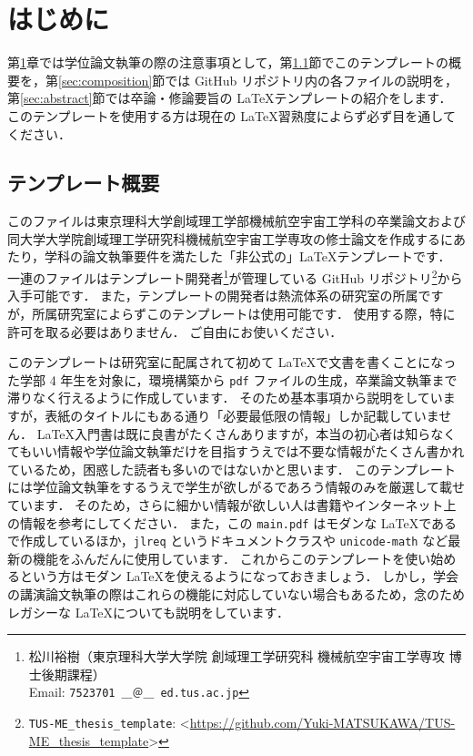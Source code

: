 \chapter{はじめに}
\label{ch:introduction}

第\ref{ch:introduction}章では学位論文執筆の際の注意事項として，第\ref{sec:template}節でこのテンプレートの概要を，第\ref{sec:composition}節では GitHub リポジトリ内の各ファイルの説明を，第\ref{sec:abstract}節では卒論・修論要旨の \LaTeX テンプレートの紹介をします．
このテンプレートを使用する方は現在の \LaTeX 習熟度によらず必ず目を通してください．

\section{テンプレート概要}
\label{sec:template}

このファイルは東京理科大学創域理工学部機械航空宇宙工学科の卒業論文および同大学大学院創域理工学研究科機械航空宇宙工学専攻の修士論文を作成するにあたり，学科の論文執筆要件を満たした「非公式の」\LaTeX テンプレートです．
一連のファイルはテンプレート開発者\footnote{松川裕樹（東京理科大学大学院 創域理工学研究科 機械航空宇宙工学専攻 博士後期課程）\\ \quad Email: \texttt{7523701 ＿＠＿ ed.tus.ac.jp}}が管理している GitHub リポジトリ\footnote{\texttt{TUS-ME\_thesis\_template}: \textless\url{https://github.com/Yuki-MATSUKAWA/TUS-ME_thesis_template}\textgreater}から入手可能です．
また，テンプレートの開発者は熱流体系の研究室の所属ですが，所属研究室によらずこのテンプレートは使用可能です．
使用する際，特に許可を取る必要はありません．
ご自由にお使いください．

このテンプレートは研究室に配属されて初めて \LaTeX で文書を書くことになった学部 4 年生を対象に，環境構築から \verb|pdf| ファイルの生成，卒業論文執筆まで滞りなく行えるように作成しています．
そのため基本事項から説明をしていますが，表紙のタイトルにもある通り「必要最低限の情報」しか記載していません．
\LaTeX 入門書は既に良書がたくさんありますが，本当の初心者は知らなくてもいい情報や学位論文執筆だけを目指すうえでは不要な情報がたくさん書かれているため，困惑した読者も多いのではないかと思います．
このテンプレートには学位論文執筆をするうえで学生が欲しがるであろう情報のみを厳選して載せています．
そのため，さらに細かい情報が欲しい人は書籍やインターネット上の情報を参考にしてください．
また，この \verb|main.pdf| はモダンな \LaTeX である \LuaLaTeX で作成しているほか，\verb|jlreq| というドキュメントクラスや \verb|unicode-math| など最新の機能をふんだんに使用しています．
これからこのテンプレートを使い始めるという方はモダン \LaTeX を使えるようになっておきましょう．
しかし，学会の講演論文執筆の際はこれらの機能に対応していない場合もあるため，念のためレガシーな \LaTeX についても説明をしています．


